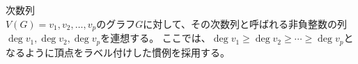 
次数列\\
$V(G) = {v_1, v_2, \ldots ,v_p}$のグラフ$G$に対して、その次数列と呼ばれる非負整数の列$\deg v_1, \deg v_2, \deg v_p$を連想する。
ここでは、$\deg v_1 \geq  \deg v_2 \geq \cdots \geq \deg v_p$となるように頂点をラベル付けした慣例を採用する。

